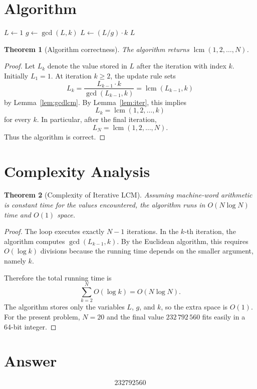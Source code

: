 \documentclass[11pt]{article}
\newtheorem{theorem}{Theorem}
\begin{document}
\section{Algorithm}

\begin{algorithm}[H]
\caption{Smallest multiple of $\{1, \ldots, N\}$ --- iterative LCM}
\begin{algorithmic}[1]
\STATE $L \gets 1$
    \STATE $g \gets \gcd(L, k)$ 
    \STATE $L \gets (L / g) \cdot k$ 
\ENDFOR
\RETURN $L$
\end{algorithmic}
\end{algorithm}

\begin{theorem}[Algorithm correctness]
The algorithm returns $\operatorname{lcm}(1,2,\ldots,N)$.
\end{theorem}

\begin{proof}
Let $L_k$ denote the value stored in $L$ after the iteration with index $k$. Initially $L_1 = 1$. At iteration $k \ge 2$, the update rule sets
\[
L_k = \frac{L_{k-1} \cdot k}{\gcd(L_{k-1}, k)} = \operatorname{lcm}(L_{k-1}, k)
\]
by Lemma~\ref{lem:gcdlcm}. By Lemma~\ref{lem:iter}, this implies
\[
L_k = \operatorname{lcm}(1,2,\ldots,k)
\]
for every $k$. In particular, after the final iteration,
\[
L_N = \operatorname{lcm}(1,2,\ldots,N).
\]
Thus the algorithm is correct.
\end{proof}

\section{Complexity Analysis}

\begin{theorem}[Complexity of Iterative LCM]
Assuming machine-word arithmetic is constant time for the values encountered, the algorithm runs in $O(N \log N)$ time and $O(1)$ space.
\end{theorem}

\begin{proof}
The loop executes exactly $N-1$ iterations. In the $k$-th iteration, the algorithm computes $\gcd(L_{k-1}, k)$. By the Euclidean algorithm, this requires $O(\log k)$ divisions because the running time depends on the smaller argument, namely $k$.

Therefore the total running time is
\[
\sum_{k=2}^{N} O(\log k) = O(N \log N).
\]
The algorithm stores only the variables $L$, $g$, and $k$, so the extra space is $O(1)$. For the present problem, $N = 20$ and the final value $232\,792\,560$ fits easily in a 64-bit integer.
\end{proof}

\section{Answer}

\[
\boxed{232792560}
\]
\end{document}
